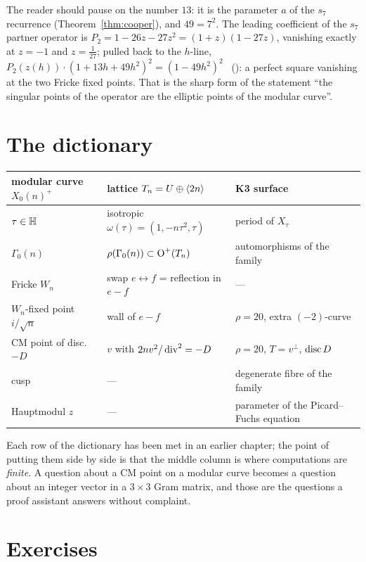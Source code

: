 The reader should pause on the number $13$: it is the parameter $a$ of the
$s_7$ recurrence (Theorem~\ref{thm:cooper}), and $49=7^2$. The leading
coefficient of the $s_7$ partner operator is $P_2=1-26z-27z^2=(1+z)(1-27z)$,
vanishing exactly at $z=-1$ and $z=\tfrac1{27}$; pulled back to the $h$-line,
$P_2(z(h))\cdot(1+13h+49h^2)^2=(1-49h^2)^2$ \Kstatus~():
a perfect square vanishing at the two Fricke fixed points. That is the sharp
form of the statement ``the singular points of the operator are the elliptic
points of the modular curve''.

\section{The dictionary}

\begin{center}
\begin{tabular}{@{}lll@{}}
\toprule
modular curve $X_0(n)^+$ & lattice $T_n=U\oplus\langle 2n\rangle$ & K3 surface\\
\midrule
$\tau\in\mathbb{H}$ & isotropic $\omega(\tau)=(1,-n\tau^2,\tau)$ & period of $X_\tau$\\
$\Gamma_0(n)$ & $\rho(\Gamma_0(n))\subset\operatorname{O}^+(T_n)$ & automorphisms of the family\\
Fricke $W_n$ & swap $e\leftrightarrow f$ = reflection in $e-f$ & ---\\
$W_n$-fixed point $i/\sqrt n$ & wall of $e-f$ & $\rho=20$, extra $(-2)$-curve\\
CM point of disc.\ $-D$ & $v$ with $2nv^2/\operatorname{div}^2=-D$ & $\rho=20$, $T=v^{\perp}$, $\operatorname{disc} D$\\
cusp & --- & degenerate fibre of the family\\
Hauptmodul $z$ & --- & parameter of the Picard--Fuchs equation\\
\bottomrule
\end{tabular}
\end{center}

Each row of the dictionary has been met in an earlier chapter; the point of
putting them side by side is that the middle column is where computations are
\emph{finite}. A question about a CM point on a modular curve becomes a
question about an integer vector in a $3\times3$ Gram matrix, and those are
the questions a proof assistant answers without complaint.

\section{Exercises}

